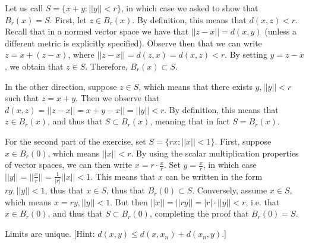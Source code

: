 \begin{solution}
    
    Let us call $S = \{x + y: \lvert \lvert y \rvert \rvert < r\}$, in which case we asked to show that $B_r(x) = S$.
    First, let $z \in B_r(x)$.
    By definition, this means that $d(x, z) < r$.
    Recall that in a normed vector space we have that $\lvert \lvert z - x \rvert \rvert = d(x, y)$ (unless a different metric is explicitly specified).
    Observe then that we can write $z = x + (z - x)$, where $\lvert \lvert z - x \rvert \rvert = d(z, x) = d(x, z) < r$. 
    By setting $y = z - x$, we obtain that $z \in S$.
    Therefore, $B_r(x) \subset S$.

    In the other direction, suppose $z \in S$, which means that there exists $y, \lvert \lvert y \rvert \rvert < r$ such that $z = x + y$.
    Then we observe that $d(x, z) = \lvert \lvert z - x \rvert \rvert = x + y - x \rvert \rvert = \lvert \lvert y \rvert \rvert < r$.
    By definition, this means that $z \in B_r(x)$, and thus that $S \subset B_r(x)$, meaning that in fact $S = B_r(x)$.

    For the second part of the exercise, set $S = \{rx : \lvert \lvert x \rvert \rvert < 1 \}$.
    First, suppose $x \in B_r(0)$, which means $ \lvert \lvert x \rvert \rvert < r$.
    By using the scalar multiplication properties of vector spaces, we can then write $x = r \cdot \frac{x}{r}$.
    Set $y = \frac{x}{r}$, in which case $\lvert \lvert y \rvert \rvert = \lvert \lvert \frac{x}{r} \rvert \rvert = \frac{1}{\lvert r \rvert} \lvert \lvert x \rvert \rvert < 1$. 
    This means that $x$ can be written in the form $ry, \lvert \lvert y \rvert \rvert < 1$, thus that $x \in S$, thus that $B_r(0) \subset S$.
    Conversely, assume $x \in S$, which means $x = ry, \lvert \lvert y \rvert \rvert < 1$.
    But then $\lvert \lvert x \rvert \rvert = \lvert \lvert r y \rvert \rvert =  \lvert r \rvert \cdot \lvert \lvert y \rvert \rvert < r$, i.e. that $x \in B_r(0)$, and thus that $S \subset B_r(0)$, completing the proof that $B_r(0) = S$.
\end{solution}

\begin{exercise}{33}
    Limits are unique. [Hint: $d(x, y) \leq d(x, x_n) + d(x_n, y)$.]
\end{exercise}

